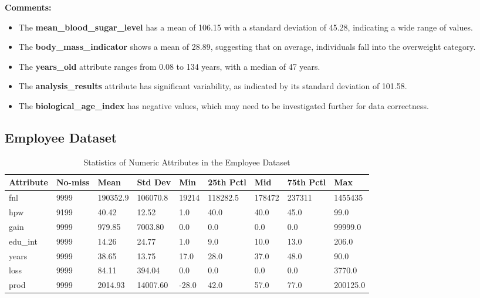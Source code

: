 \documentclass[a4paper,12pt]{article}
\begin{document}
\textbf{Comments:}
\begin{itemize}
    \item The \textbf{mean\_blood\_sugar\_level} has a mean of 106.15 with a standard deviation of 45.28, indicating a wide range of values.
    \item The \textbf{body\_mass\_indicator} shows a mean of 28.89, suggesting that on average, individuals fall into the overweight category.
    \item The \textbf{years\_old} attribute ranges from 0.08 to 134 years, with a median of 47 years.
    \item The \textbf{analysis\_results} attribute has significant variability, as indicated by its standard deviation of 101.58.
    \item The \textbf{biological\_age\_index} has negative values, which may need to be investigated further for data correctness.
\end{itemize}

\subsection{Employee Dataset}

\begin{table}[h!]
\centering
\caption{Statistics of Numeric Attributes in the Employee Dataset}
\vspace{0.5cm}
\small
\begin{tabularx}{\textwidth}{|l|X|X|X|X|X|X|X|X|}
\hline
\textbf{Attribute} & \textbf{No-miss} & \textbf{Mean} & \textbf{Std Dev} & \textbf{Min} & \textbf{25th Pctl} & \textbf{Mid} & \textbf{75th Pctl} & \textbf{Max} \\
\hline
fnl & 9999 & 190352.9 & 106070.8 & 19214 & 118282.5 & 178472 & 237311 & 1455435 \\
hpw & 9199 & 40.42 & 12.52 & 1.0 & 40.0 & 40.0 & 45.0 & 99.0 \\
gain & 9999 & 979.85 & 7003.80 & 0.0 & 0.0 & 0.0 & 0.0 & 99999.0 \\
edu\_int & 9999 & 14.26 & 24.77 & 1.0 & 9.0 & 10.0 & 13.0 & 206.0 \\
years & 9999 & 38.65 & 13.75 & 17.0 & 28.0 & 37.0 & 48.0 & 90.0 \\
loss & 9999 & 84.11 & 394.04 & 0.0 & 0.0 & 0.0 & 0.0 & 3770.0 \\
prod & 9999 & 2014.93 & 14007.60 & -28.0 & 42.0 & 57.0 & 77.0 & 200125.0 \\
\hline
\end{tabularx}
\normalsize
\end{table}
\end{document}
